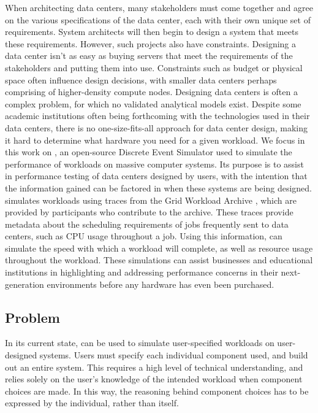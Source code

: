 \documentclass[11pt]{article}
\begin{document}
		When architecting data centers, many stakeholders must come together and agree on the various specifications of the data center, each with their own unique set of requirements. 
		System architects will then begin to design a system that meets these requirements. 
		However, such projects also have constraints. 
		Designing a data center isn't as easy as buying servers that meet the requirements of the stakeholders and putting them into use. 
		Constraints such as budget or physical space often influence design decisions, with smaller data centers perhaps comprising of higher-density compute nodes. 
		Designing data centers is often a complex problem, for which no validated analytical models exist. 
		Despite some academic institutions often being forthcoming with the technologies used in their data centers, there is no one-size-fits-all approach for data center design, making it hard to determine what hardware you need for a given workload.
		We focus in this work on \opendc{}, an open-source Discrete Event Simulator used to simulate the performance of workloads on massive computer systems. 
		Its purpose is to assist in performance testing of data centers designed by users, with the intention that the information gained can be factored in when these systems are being designed. 
		\opendc{} simulates workloads using traces from the Grid Workload Archive \cite{Iosup2008}, which are provided by participants who contribute to the archive. 
		These traces provide metadata about the scheduling requirements of jobs frequently sent to data centers, such as CPU usage throughout a job. 
		Using this information, \opendc{} can simulate the speed with which a workload will complete, as well as resource usage throughout the workload. 
		These simulations can assist businesses and educational institutions in highlighting and addressing performance concerns in their next-generation environments before any hardware has even been purchased.
	\subsection{Problem}
		In its current state, \opendc{} can be used to simulate user-specified workloads on user-designed systems. 
		Users must specify each individual component used, and build out an entire system. 
		This requires a high level of technical understanding, and relies solely on the user's knowledge of the intended workload when component choices are made. 
		In this way, the reasoning behind component choices has to be expressed by the individual, rather than \opendc{} itself. 
\end{document}
